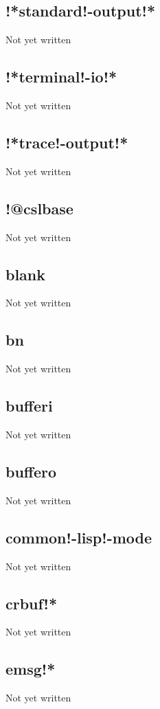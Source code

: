 \documentclass[a4paper,11pt]{article}
\begin{document}
\subsection{\ttfamily !*standard!-output!*}
   Not yet written

\subsection{\ttfamily !*terminal!-io!*}
   Not yet written

\subsection{\ttfamily !*trace!-output!*}
   Not yet written

\subsection{\ttfamily !@cslbase}
   Not yet written

\subsection{\ttfamily blank}
   Not yet written

\subsection{\ttfamily bn}
   Not yet written

\subsection{\ttfamily bufferi}
   Not yet written

\subsection{\ttfamily buffero}
   Not yet written

\subsection{\ttfamily common!-lisp!-mode}
   Not yet written

\subsection{\ttfamily crbuf!*}
   Not yet written

\subsection{\ttfamily emsg!*}
   Not yet written
\end{document}
